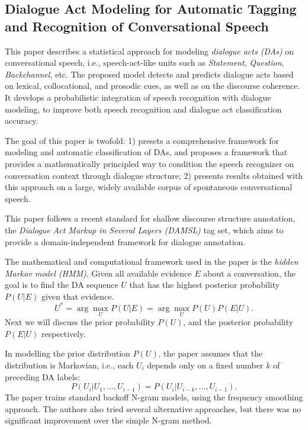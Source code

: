\subsection{Dialogue Act Modeling for Automatic Tagging and Recognition of Conversational Speech \cite{Stolcke2000}}

This paper describes a statistical approach for modeling \emph{dialogue acts (DAs)} on conversational speech, i.e., speech-act-like units such as \emph{Statement}, \emph{Question}, \emph{Backchannel}, etc. The proposed model detects and predicts dialogue acts based on lexical, collocational, and prosodic cues, as well as on the discourse coherence. It develops a probabilistic integration of speech recognition with dialogue modeling, to improve both speech recognition and dialogue act classification accuracy.

The goal of this paper is twofold: 1) presets a comprehensive framework for modeling and automatic classification of DAs, and proposes a framework that provides a mathematically principled way to condition the speech recognizer on conversation context through dialogue structure; 2) presents results obtained with this approach on a large, widely available corpus of spontaneous conversational speech.

This paper follows a recent standard for shallow discourse structure annotation, the \emph{Dialogue Act Markup in Several Layers (DAMSL)} tag set, which aims to provide a domain-independent framework for dialogue annotation.

The mathematical and computational framework used in the paper is the \emph{hidden Markov model (HMM)}. Given all available evidence $E$ about a conversation, the goal is to find the DA sequence $U$ that has the highest posterior probability $P(U|E)$ given that evidence.
$$U^* = \arg\max_U P(U|E) = \arg\max_U P(U) P(E|U).$$
Next we will discuss the prior probability $P(U)$, and the posterior probability $P(E|U)$ respectively.

In modelling the prior distribution $P(U)$, the paper assumes that the distribution is Markovian, i.e., each $U_i$ depends only on a fixed number $k$ of preceding DA labels:
$$P(U_i | U_1, ..., U_{i-1}) = P(U_i | U_{i-k}, ..., U_{i-1}).$$
The paper trains standard backoff N-gram models, using the frequency smoothing approach. The authors also tried several alternative approaches, but there was no significant improvement over the simple N-gram method.

